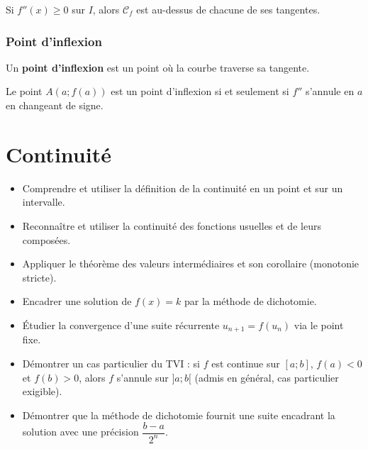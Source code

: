 \documentclass[11pt,a4paper,openany]{book}
\theoremstyle{definition}
\newcommand{\nchap}{
    \setcounter{Définition}{0}
    \setcounter{Propriété}{0}
    \setcounter{Théorème}{0}
    \setcounter{Remarque}{0}
    \setcounter{Exemple}{0}
}
\begin{document}
    \begin{Propriété}
        Si $f''(x)\geq 0$ sur $I$, alors $\mathcal{C}_f$ est au-dessus de chacune de ses
        tangentes.
    \end{Propriété}

    \subsection{Point d'inflexion}
    \begin{Définition}
        Un \textbf{point d'inflexion} est un point où la courbe traverse sa tangente.
    \end{Définition}

    \begin{Propriété}
        Le point $A(a;f(a))$ est un point d'inflexion si et seulement si $f''$ s'annule en
        $a$ en changeant de signe.
    \end{Propriété}

    \chapter{Continuité}
    \nchap

    \begin{capacitesbox}
    \begin{itemize}
        \item Comprendre et utiliser la définition de la continuité en un point et sur un intervalle.
        \item Reconnaître et utiliser la continuité des fonctions usuelles et de leurs composées.
        \item Appliquer le théorème des valeurs intermédiaires et son corollaire (monotonie stricte).
        \item Encadrer une solution de $f(x)=k$ par la méthode de dichotomie.
        \item Étudier la convergence d'une suite récurrente $u_{n+1}=f(u_n)$ via le point fixe.
    \end{itemize}
    \end{capacitesbox}

    \begin{demoprogbox}
    \begin{itemize}
        \item Démontrer un cas particulier du TVI : si $f$ est continue sur $[a;b]$, $f(a)<0$
              et $f(b)>0$, alors $f$ s'annule sur $]a;b[$ (admis en général, cas particulier exigible).
        \item Démontrer que la méthode de dichotomie fournit une suite encadrant la solution avec
              une précision $\dfrac{b-a}{2^n}$.
    \end{itemize}
    \end{demoprogbox}
\end{document}
